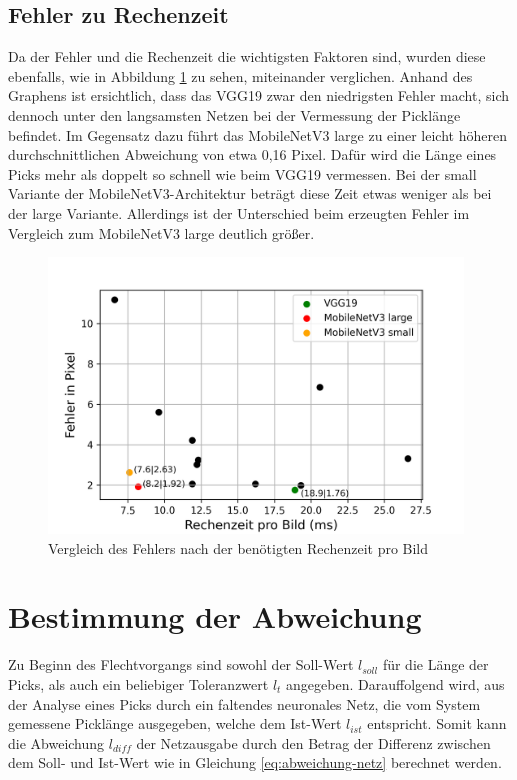 \subsection{Fehler zu Rechenzeit}
Da der Fehler und die Rechenzeit die wichtigsten Faktoren sind, wurden diese ebenfalls, wie in Abbildung \ref{fig:time_error_graph} zu sehen, miteinander verglichen. Anhand des Graphens ist ersichtlich, dass das VGG19 zwar den niedrigsten Fehler macht, sich dennoch unter den langsamsten Netzen bei der Vermessung der Picklänge befindet. Im Gegensatz dazu führt das MobileNetV3 large zu einer leicht höheren durchschnittlichen Abweichung von etwa 0,16 Pixel. Dafür wird die Länge eines Picks mehr als doppelt so schnell wie beim VGG19 vermessen. Bei der small Variante der MobileNetV3-Architektur beträgt diese Zeit etwas weniger als bei der large Variante. Allerdings ist der Unterschied beim erzeugten Fehler im Vergleich zum MobileNetV3 large deutlich größer. 

\begin{figure}[h!]
\centering
\includegraphics[width=11cm]{98_images/time_error_graph.png}
\caption{Vergleich des Fehlers nach der benötigten Rechenzeit pro Bild}
\label{fig:time_error_graph}
\end{figure}


\section{Bestimmung der Abweichung}
Zu Beginn des Flechtvorgangs sind sowohl der Soll-Wert $l_{soll}$ für die Länge der Picks, als auch ein beliebiger Toleranzwert $l_t$ angegeben. Darauffolgend wird, aus der Analyse eines Picks durch ein faltendes neuronales Netz, die vom System gemessene Picklänge ausgegeben, welche dem Ist-Wert $l_{ist}$ entspricht. Somit kann die Abweichung $l_{diff}$ der Netzausgabe durch den Betrag der Differenz zwischen dem Soll- und Ist-Wert wie in Gleichung \ref{eq:abweichung-netz} berechnet werden. 


